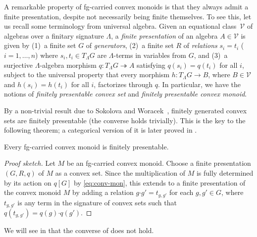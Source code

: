 \documentclass[a4paper, UKenglish, numberwithinsect, thm-restate, cleveref, final]{lipics-v2021}
\theoremstyle{plain}
\theoremstyle{definition}
\newcommand{\finite}{fg-carried\xspace}
\newcommand{\epito}{\ensuremath{\twoheadrightarrow}}
\newcommand{\mult}{\mathbin{\boldsymbol{\cdot}}}
\newcommand{\V}{\mathcal{V}}
\numberwithin{equation}{section}
\begin{document}
A remarkable property of \finite convex monoids is that they always admit a finite presentation, despite not necessarily being finite themselves. To see this, let us recall some terminology from universal algebra. Given an equational class~$\V$ of algebras over a finitary signature $\Lambda$, a \emph{finite presentation} of an algebra $A\in \V$ is given by (1)~a finite set $G$ of \emph{generators}, (2)~a finite set $R$ of \emph{relations} $s_i=t_i$ ($i=1,\ldots,n$) where $s_i,t_i\in T_\Lambda G$ are $\Lambda$-terms in variables from $G$, and (3)~a surjective $\Lambda$-algebra morphism $q\colon T_\Lambda G\epito A$ satisfying $q(s_i)=q(t_i)$ for all $i$, subject to the universal property that every morphism $h\colon T_\Lambda G\to B$, where $B\in \V$ and $h(s_i)=h(t_i)$ for all $i$, factorizes through $q$. In particular, we have the notions of \emph{finitely presentable convex set} and \emph{finitely presentable convex monoid}.

 By a non-trivial result due to Sokolova and Woracek~\cite{sokolova-15}, finitely generated
 convex sets are finitely presentable (the converse holds trivially). This is the key to the
 following theorem; a categorical version of it is later proved in .

\begin{theorem}\label{thm:fg-carried-implies-fp}
Every \finite convex monoid is finitely presentable.
\end{theorem}
\begin{proof}[Proof sketch]
  Let $M$ be an \finite convex monoid. Choose a finite presentation
  $(G,R,q)$ of $M$ as a convex set. Since the multiplication of $M$ is
  fully determined by its action on $q[G]$ by \eqref{eq:conv-mon},
  this extends to a finite presentation of the convex monoid $M$ by
  adding a relation $g \mult g' = t_{g,g'}$ for each $g,g'\in G$,
  where $t_{g,g'}$ is any term in the signature of convex sets such
  that $q(t_{g,g'})=q(g)\mult q(g')$.  \end{proof}


\noindent
We will see in  that the converse of  does not hold.
\end{document}
